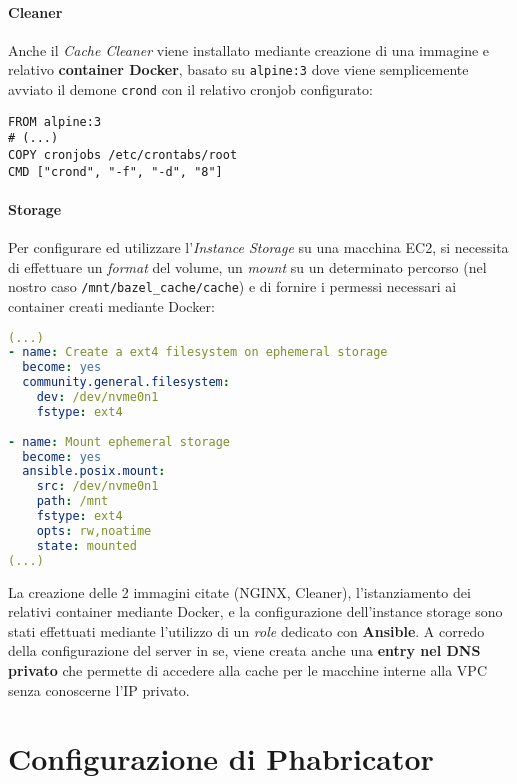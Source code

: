 \documentclass[../main.tex]{subfiles}
\begin{document}
    	    \paragraph{Cleaner}
    	    Anche il \emph{Cache Cleaner} viene installato mediante creazione di una immagine e relativo \textbf{container Docker}, basato su \verb|alpine:3| dove viene semplicemente avviato il demone \verb|crond| con il relativo cronjob configurato:
    	    \begin{lstlisting}[language=docker]
FROM alpine:3
# (...)
COPY cronjobs /etc/crontabs/root
CMD ["crond", "-f", "-d", "8"]
    	    \end{lstlisting}
    	    
    	    \paragraph{Storage}
    	    Per configurare ed utilizzare l'\emph{Instance Storage} su una macchina EC2, si necessita di effettuare un \emph{format} del volume, un \emph{mount} su un determinato percorso (nel nostro caso \verb|/mnt/bazel_cache/cache|) e di fornire i permessi necessari ai container creati mediante Docker:
    	    \begin{lstlisting}[language=yaml]
(...)
- name: Create a ext4 filesystem on ephemeral storage
  become: yes
  community.general.filesystem:
    dev: /dev/nvme0n1
    fstype: ext4
    
- name: Mount ephemeral storage
  become: yes
  ansible.posix.mount:
    src: /dev/nvme0n1
    path: /mnt
    fstype: ext4
    opts: rw,noatime
    state: mounted
(...)
    	    \end{lstlisting}
    	    
    	    La creazione delle 2 immagini citate (NGINX, Cleaner), l'istanziamento dei relativi container mediante Docker, e la configurazione dell'instance storage sono stati effettuati mediante l'utilizzo di un \emph{role} dedicato con \textbf{Ansible}. A corredo della configurazione del server in se, viene creata anche una \textbf{entry nel DNS privato} che permette di accedere alla cache per le macchine interne alla VPC senza conoscerne l'IP privato.
    	
    	\section{Configurazione di Phabricator}
    	
\end{document}
